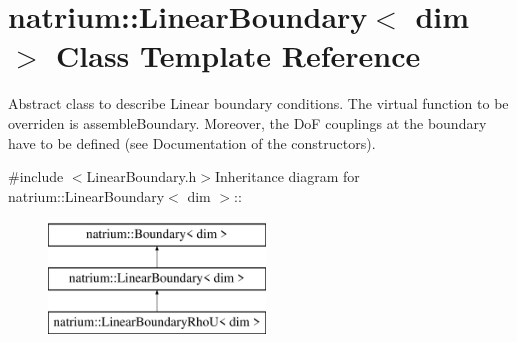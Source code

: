 \hypertarget{classnatrium_1_1LinearBoundary}{
\section{natrium::LinearBoundary$<$ dim $>$ Class Template Reference}
\label{classnatrium_1_1LinearBoundary}
}


Abstract class to describe Linear boundary conditions. The virtual function to be overriden is assembleBoundary. Moreover, the DoF couplings at the boundary have to be defined (see Documentation of the constructors).  


{\ttfamily \#include $<$LinearBoundary.h$>$}Inheritance diagram for natrium::LinearBoundary$<$ dim $>$::\begin{figure}[H]
\begin{center}
\leavevmode
\includegraphics[height=3cm]{classnatrium_1_1LinearBoundary}
\end{center}
\end{figure}
